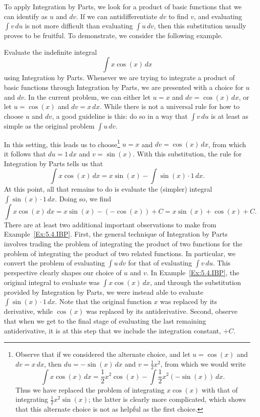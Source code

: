 \vspace*{5pt}
\nin {}
\vspace*{1pt}

To apply Integration by Parts, we look for a product of basic functions that we can identify as $u$ and $dv$.  If we can antidifferentiate $dv$ to find $v$, and evaluating $\int v \, du$ is not more difficult than evaluating $\int u \, dv$, then this substitution usually proves to be fruitful.  To demonstrate, we consider the following example.

\bex \label{Ex:5.4.IBP}
Evaluate the indefinite integral
$$\int x\cos(x) \, dx$$
using Integration by Parts.
\eex
Whenever we are trying to integrate a product of basic functions through Integration by Parts, we are presented with a choice for $u$ and $dv$.  In the current problem, we can either let $u = x$ and $dv = \cos(x) \, dx$, or let $u = \cos(x)$ and $dv = x \, dx$.  While there is not a universal rule for how to choose $u$ and $dv$, a good guideline is this:  do so in a way that $\int v \, du$ is at least as simple as the original problem $\int u \, dv$.  

In this setting, this leads us to choose\footnote{Observe that if we considered the alternate choice, and let $u = \cos(x)$ and $dv = x \, dx$, then $du = -\sin(x) \, dx$ and $v = \frac{1}{2}x^2$, from which we would write
$$\int x\cos(x) \, dx = \frac{1}{2}x^2 \cos(x) - \int \frac{1}{2}x^2 (-\sin(x)) \, dx.$$
Thus we have replaced the problem of integrating $x \cos(x)$ with that of integrating $\frac{1}{2}x^2 \sin(x)$; the latter is clearly more complicated, which shows that this alternate choice is not as helpful as the first choice.} $u = x$ and $dv = \cos(x) \, dx$, from which it follows that $du = 1 \, dx$ and $v = \sin(x)$.  With this substitution, the rule for Integration by Parts tells us that
$$\int x \cos(x) \, dx = x \sin(x) - \int \sin(x) \cdot 1 \, dx.$$
At this point, all that remains to do is evaluate the (simpler) integral $\int \sin(x) \cdot 1 \, dx.$  Doing so, we find
$$\int x \cos(x) \, dx = x \sin(x) - (-\cos(x)) + C = x\sin(x) + \cos(x) + C.$$
\afterex
There are at least two additional important observations to make from Example~\ref{Ex:5.4.IBP}.  First, the general technique of Integration by Parts involves trading the problem of integrating the product of two functions for the problem of integrating the product of two related functions.  In particular, we convert the problem of evaluating $\int u \, dv$ for that of evaluating $\int v \, du$.  This perspective clearly shapes our choice of $u$ and $v$.  In  Example~\ref{Ex:5.4.IBP}, the original integral to evaluate was $\int x \cos(x) \,dx$, and through the substitution provided by Integration by Parts, we were instead able to evaluate $\int \sin(x) \cdot 1 \, dx$.  Note that the original function $x$ was replaced by its derivative, while $\cos(x)$ was replaced by its antiderivative.  Second, observe that when we get to the final stage of evaluating the last remaining antiderivative, it is at this step that we include the integration constant, $+C$.  


